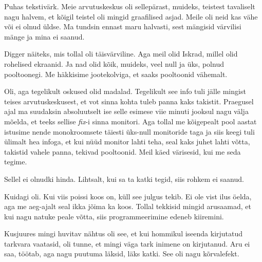 
Puhas tekstivärk. Meie arvutuskeskus oli sellepärast, muideks,  teistest tavaliselt nagu halvem, et kõigil teistel oli mingid graafilised asjad. Meile oli neid kas vähe või ei olnud üldse. Ma tundsin ennast maru halvasti, sest mängisid värvilisi mänge ja mina ei saanud. 


Digger näiteks, mis tollal oli täisvärviline. Aga meil olid Iskrad, millel olid rohelised ekraanid. Ja nad olid kõik, muideks, veel null ja üks, polnud  pooltoonegi. Me häkkisime  jootekolviga, et saaks pooltoonid vähemalt. 


Oli, aga tegelikult oskused olid madalad. Tegelikult see info tuli  jälle mingist teises arvutuskeskusest, et vot sinna kohta tuleb panna kaks takistit. Praegusel ajal ma suudaksin absoluutselt ise selle esimese viie minuti jooksul nagu välja mõelda, et teeks sellise \emph{fix}-i sinna monitori. Aga tollal me kõigepealt pool aastat istusime nende monokroomsete täiesti üks-null monitoride taga ja siis keegi tuli ülimalt hea infoga, et kui nüüd monitor lahti teha, seal kaks juhet lahti võtta, takistid vahele panna, tekivad pooltoonid. Meil käed värisesid, kui me seda tegime. 


Sellel ei olnudki hinda. Lihtsalt, kui sa ta katki tegid, siis rohkem ei saanud.


Kuidagi oli. Kui viis poissi koos on, küll see julgus tekib. Ei ole vist ilus öelda, aga me aeg-ajalt seal ikka jõima ka koos. Tollal tekkisid mingid arusaamad, et kui nagu natuke peale võtta, siis programmeerimine edeneb kiiremini. 

Kusjuures mingi huvitav nähtus oli see, et kui hommikul iseenda kirjutatud tarkvara vaatasid, oli tunne, et mingi väga tark inimene on kirjutanud. Aru ei saa, töötab, aga nagu puutuma läksid, läks katki. See oli nagu  kõrvalefekt. 


